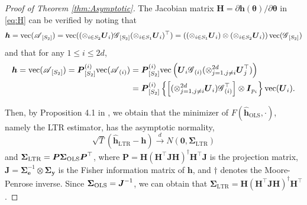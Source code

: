 \documentclass[12pt]{article}
\newcommand{\bm}{\boldsymbol}
\newcommand{\cm}[1]{\mbox{\boldmath$\mathscr{#1}$}}
\begin{document}
\begin{proof}[Proof of Theorem \ref{thm:Asymptotic}]
	The Jacobian matrix $\bm{H}={\partial\bm{h}(\bm{\theta})}/{\partial\bm{\theta}}$ in \eqref{eq:H} can be verified by noting that
	\[
	\bm{h}=\text{vec}(\cm{A}_{[S_2]})=\text{vec}((\otimes_{i\in S_2}\bm{U}_i)\cm{G}_{[S_2]}(\otimes_{i\in S_1}\bm{U}_i)^\top)=\left ((\otimes_{i\in S_1}\bm{U}_i)\otimes(\otimes_{i\in S_2}\bm{U}_i)\right )\text{vec}(\cm{G}_{[S_2]})
	\]
	and  that	for any $1\leq i \leq 2d$,
	\begin{equation}\begin{split}
	\bm{h}=\text{vec}(\cm{A}_{[S_2]})=\bm{P}^{(i)}_{[S_2]}\text{vec}(\cm{A}_{(i)})&=\bm{P}_{[S_2]}^{(i)}\text{vec}\left (\bm{U}_i\cm{G}_{(i)}(\otimes_{j=1,j\neq i}^{2d}\bm{U}_j^\top)\right )\\
	&=\bm{P}^{(i)}_{[S_2]}\left \{\left [(\otimes_{j=1, j\neq i}^{2d}\bm{U}_i)\cm{G}_{(i)}^\top\right ]\otimes\bm{I}_{p_{i}}\right \} \text{vec}(\bm{U}_i). 	\end{split}
	\end{equation}
   
	Then, by Proposition 4.1 in \citet{shapiro1986asymptotic}, we obtain that the minimizer of $F(\bm{\widehat{h}}_{\text{OLS}},\cdot)$, namely the LTR estimator, has the asymptotic normality,
	\begin{equation}
	\sqrt{T}(\bm{\widehat{h}}_{\text{LTR}}-\bm{h})\overset{d}{\to}N(\bm{0},\bm{\Sigma}_{\text{LTR}})
	\end{equation}
	and $\bm{\Sigma}_{\text{LTR}}=\bm{P}\bm{\Sigma}_{\textup{OLS}}\bm{P}^\top$, where $\bm{P}=\bm{H}(\bm{H}^\top\bm{JH})^\dagger\bm{H}^\top\bm{J}$ is the projection matrix, $\bm{J}=\bm{\Sigma}_{\bm{e}}^{-1}\otimes\bm{\Sigma}_{\bm{y}}$ is the Fisher information matrix of $\bm{h}$, and $\dagger$ denotes the Moore-Penrose inverse. Since $\bm{\Sigma}_{\textup{OLS}}=\bm{J}^{-1}$, we can obtain that $\bm{\Sigma}_{\text{LTR}}=\bm{H}(\bm{H}^\top\bm{JH})^\dagger\bm{H}^\top$.
\end{proof}
\end{document}
